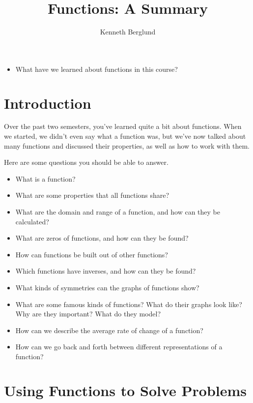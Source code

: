 \documentclass{ximera}
\author{Kenneth Berglund}
\title{Functions: A Summary}
\begin{document}
\begin{abstract}
\end{abstract}
\maketitle
%
%
%
\begin{motivatingQuestions}\begin{itemize}
\item What have we learned about functions in this course?
\end{itemize}\end{motivatingQuestions}
%
%
%
\section{Introduction}
%
Over the past two semesters, you've learned quite a bit about functions. When we started, we didn't even say what a function was, but we've now talked about many functions and discussed their properties, as well as how to work with them.

Here are some questions you should be able to answer. 
\begin{itemize}
\item What is a function?
\item What are some properties that all functions share?
\item What are the domain and range of a function, and how can they be calculated?
\item What are zeros of functions, and how can they be found? 
\item How can functions be built out of other functions? 
\item Which functions have inverses, and how can they be found?
\item What kinds of symmetries can the graphs of functions show?
\item What are some famous kinds of functions? What do their graphs look like? Why are they important? What do they model?
\item How can we describe the average rate of change of a function?
\item How can we go back and forth between different representations of a function?
\end{itemize}

\section{Using Functions to Solve Problems}
\end{document}
